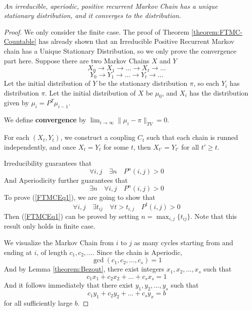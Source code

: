     \paragraph{}
        \emph{An irreducible, aperiodic, positive recurrent Markov Chain has a unique stationary distribution, and it converges to the distribution.}

    \begin{proof}
        We only consider the finite case. The proof of Theorem \ref{theorem:FTMC-Countable} has already shown that an Irreducible Positive Recurrent Markov chain has a Unique Stationary Distribution, so we only prove the convergence part here. Suppose there are two Markov Chains $X$ and $Y$
        \[ X_0 \to X_1 \to \dots \to X_t \to \dots \]
        \[ Y_0 \to Y_1 \to \dots \to Y_t \to \dots \]
        Let the initial distribution of $Y$ be the stationary distribution $\pi$, so each $Y_i$ has distribution $\pi$. Let the initial distribution of $X$ be $\mu_0$, and $X_i$ has the distribution given by $\mu_{i} = P^T\mu_{i-1}$.

        We define \textbf{convergence} by $\lim_{i\to\infty}\|\mu_{i} - \pi\|_{TV} = 0$.

        For each $(X_t, Y_t)$, we construct a coupling $C_t$ such that each chain is runned independently, and once $X_t = Y_t$ for some $t$, then $X_{t'} = Y_{t'}$ for all $t' \ge t$.

        Irreducibility guarantees that 
        \[ \forall i,j \quad \exists n \quad P^n(i,j) > 0 \]
        And Aperiodicity further guarantees that
        \begin{equation}\label{FTMCEq1}
            \exists n \quad \forall i,j \quad P^n(i,j) > 0
        \end{equation}
        To prove (\ref{FTMCEq1}), we are going to show that
        \begin{equation}\label{FTMCEq2}
            \forall i,j \quad \exists t_{ij} \quad \forall t>t_{i,j} \quad P^t(i,j) > 0
        \end{equation}
        Then (\ref{FTMCEq1}) can be proved by setting $n = \max_{i,j}\{t_{ij}\}$. Note that this result only holds in finite case.

        We visualize the Markov Chain from $i$ to $j$ as many cycles starting from and ending at $i$, of length $c_1,c_2,\dots$. Since the chain is Aperiodic,
        \[ \gcd(c_1, c_2,\dots,c_s) = 1 \]
        And by Lemma \ref{theorem:Bezout}, there exist integers $x_1,x_2,\dots,x_s$ such that
        \[ c_1x_1 + c_2x_2 + \dots + c_sx_s = 1 \]
        And it follows immediately that there exist $y_1,y_2,\dots,y_s$ such that
        \[ c_1y_1 + c_2y_2 + \dots + c_sy_x = b \]
        for all sufficiently large $b$.


\end{proof}
